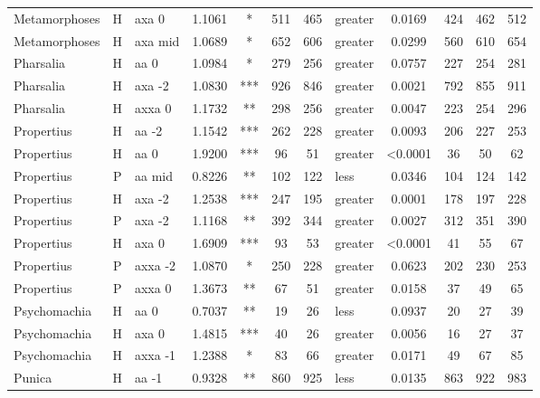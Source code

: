 \documentclass[twocolumn, switch, a4paper]{article} %
\begin{document}
\begin{table}[h!]
\begin{adjustbox}{totalheight=0.9\textheight}
\begin{tabular}{lclcccclcc@{\hspace{1\tabcolsep}}c@{\hspace{1\tabcolsep}}c}
 Metamorphoses &     H &     axa 0 & 1.1061 &     * &   511 &       465 &     greater & 0.0169 &   424 &   462 &   512 \\
 Metamorphoses &     H &   axa mid & 1.0689 &     * &   652 &       606 &     greater & 0.0299 &   560 &   610 &   654 \\
     Pharsalia &     H &      aa 0 & 1.0984 &     * &   279 &       256 &     greater & 0.0757 &   227 &   254 &   281 \\
     Pharsalia &     H &    axa -2 & 1.0830 &   *** &   926 &       846 &     greater & 0.0021 &   792 &   855 &   911 \\
     Pharsalia &     H &    axxa 0 & 1.1732 &    ** &   298 &       256 &     greater & 0.0047 &   223 &   254 &   296 \\
    Propertius &     H &     aa -2 & 1.1542 &   *** &   262 &       228 &     greater & 0.0093 &   206 &   227 &   253 \\
    Propertius &     H &      aa 0 & 1.9200 &   *** &    96 &        51 &     greater & <0.0001 &    36 &    50 &    62 \\
    Propertius &     P &    aa mid & 0.8226 &    ** &   102 &       122 &        less & 0.0346 &   104 &   124 &   142 \\
    Propertius &     H &    axa -2 & 1.2538 &   *** &   247 &       195 &     greater & 0.0001 &   178 &   197 &   228 \\
    Propertius &     P &    axa -2 & 1.1168 &    ** &   392 &       344 &     greater & 0.0027 &   312 &   351 &   390 \\
    Propertius &     H &     axa 0 & 1.6909 &   *** &    93 &        53 &     greater & <0.0001 &    41 &    55 &    67 \\
    Propertius &     P &   axxa -2 & 1.0870 &     * &   250 &       228 &     greater & 0.0623 &   202 &   230 &   253 \\
    Propertius &     P &    axxa 0 & 1.3673 &    ** &    67 &        51 &     greater & 0.0158 &    37 &    49 &    65 \\
  Psychomachia &     H &      aa 0 & 0.7037 &    ** &    19 &        26 &        less & 0.0937 &    20 &    27 &    39 \\
  Psychomachia &     H &     axa 0 & 1.4815 &   *** &    40 &        26 &     greater & 0.0056 &    16 &    27 &    37 \\
  Psychomachia &     H &   axxa -1 & 1.2388 &     * &    83 &        66 &     greater & 0.0171 &    49 &    67 &    85 \\
        Punica &     H &     aa -1 & 0.9328 &    ** &   860 &       925 &        less & 0.0135 &   863 &   922 &   983 \\

\end{tabular}
\end{adjustbox}
\end{table}
\end{document}
